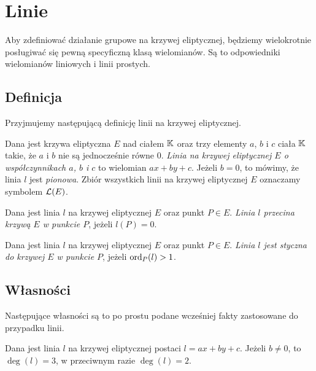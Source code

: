 \section{Linie}

\noindent
Aby zdefiniować działanie grupowe na krzywej eliptycznej,
będziemy wielokrotnie posługiwać się
pewną specyficzną klasą wielomianów.
Są to odpowiedniki wielomianów liniowych
i linii prostych.

\subsection*{Definicja}

\noindent
Przyjmujemy następującą definicję linii na krzywej eliptycznej.

\begin{definition}
Dana jest krzywa eliptyczna $E$ nad ciałem $\mathbb{K}$
oraz trzy elementy $a$, $b$ i $c$ ciała $\mathbb{K}$ takie,
że $a$ i $b$ nie są jednocześnie równe $0$.
\emph{Linia na krzywej eliptycznej $E$ o współczynnikach $a$, $b$ i $c$}
to wielomian $ax + by + c$.
Jeżeli $b = 0$, to mówimy, że linia $l$ jest \emph{pionowa}.
Zbiór wszystkich linii na krzywej eliptycznej $E$
oznaczamy symbolem $\mathcal{L}(E)$.
\end{definition}

\begin{definition}
Dana jest linia $l$ na krzywej eliptycznej $E$
oraz punkt $P \in E$.
\emph{Linia $l$ przecina krzywą $E$ w punkcie $P$},
jeżeli $l(P) = 0$.
\end{definition}

\begin{definition}
Dana jest linia $l$ na krzywej eliptycznej $E$
oraz punkt $P \in E$.
\emph{Linia $l$ jest styczna do krzywej $E$ w punkcie $P$},
jeżeli $\operatorname{ord}_P(l) > 1$.
\end{definition}

\subsection*{Własności}

\noindent
Następujące własności są to po prostu podane wcześniej fakty
zastosowane do przypadku linii.

\begin{fact}\label{line_deg_fact}
Dana jest linia $l$ na krzywej eliptycznej postaci $l = ax + by + c$.
Jeżeli $b \neq 0$, to $\deg(l) = 3$,
w przeciwnym razie $\deg(l) = 2$.
\end{fact}

